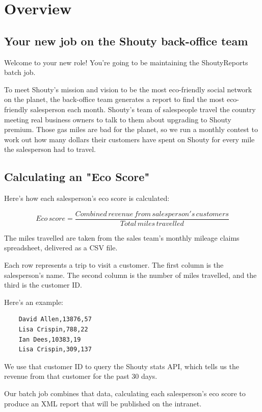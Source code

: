 \chapter*{Overview}

\section*{Your new job on the Shouty back-office team}


Welcome to your new role! You're going to be maintaining the ShoutyReports batch job.

To meet Shouty's mission and vision to be the most eco-friendly social network on the planet, the back-office team generates a report to find the most eco-friendly salesperson each month. Shouty's team of salespeople travel the country meeting real business owners to talk to them about upgrading to Shouty premium. Those gas miles are bad for the planet, so we run a monthly contest to work out how many dollars their customers have spent on Shouty for every mile the salesperson had to travel.

\section*{Calculating an "Eco Score"}

Here's how each salesperson's eco score is calculated:

\[
Eco\, score = \frac {Combined\, revenue\, from\, salesperson's\, customers} {Total\, miles\, travelled}
\]

The miles travelled are taken from the sales team's monthly mileage claims spreadsheet, delivered as a CSV file.

Each row represents a trip to visit a customer. The first column is the salesperson's name. The second column is the number of miles travelled, and the third is the customer ID.

Here's an example:

\begin{verbatim}
    David Allen,13876,57
    Lisa Crispin,788,22
    Ian Dees,10383,19
    Lisa Crispin,309,137
\end{verbatim}

We use that customer ID to query the Shouty stats API, which tells us the revenue from that customer for the past 30 days.

Our batch job combines that data, calculating each salesperson's eco score to produce an XML report that will be published on the intranet.

